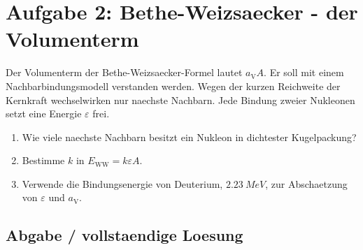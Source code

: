 \documentclass[11pt,a4paper]{scrartcl}
\newcommand{\MeV}{\si{MeV}}
\theoremstyle{definition}
\theoremstyle{plain}
\theoremstyle{remark}
\newcommand{\EWW}{E_{\mathrm{WW}}}
\newcommand{\aV}{a_{\mathrm V}}
\begin{document}
\newpage

\section{Aufgabe 2: Bethe-Weizsaecker - der Volumenterm}

\begin{taskbox}
Der Volumenterm der Bethe-Weizsaecker-Formel lautet $\aV A$. Er soll mit einem Nachbarbindungsmodell verstanden werden. Wegen der kurzen Reichweite der Kernkraft wechselwirken nur naechste Nachbarn. Jede Bindung zweier Nukleonen setzt eine Energie $\varepsilon$ frei.
\begin{enumerate}[label=(\alph*)]
    \item Wie viele naechste Nachbarn besitzt ein Nukleon in dichtester Kugelpackung?
    \item Bestimme $k$ in $\EWW=k\varepsilon A$.
    \item Verwende die Bindungsenergie von Deuterium, $\SI{2.23}{\MeV}$, zur Abschaetzung von $\varepsilon$ und $\aV$.
\end{enumerate}
\end{taskbox}

\subsection{Abgabe / vollstaendige Loesung}
\end{document}
